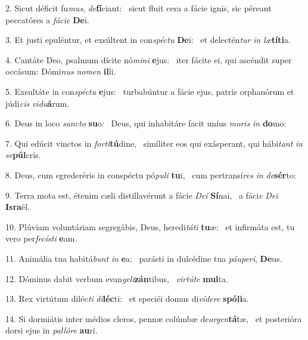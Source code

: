 2. Sicut déficit fu\textit{mus}, \textit{de}\textbf{fí}ciant: \ast\  sicut fluit cera a fácie ignis, sic péreant peccatóres a \textit{fá}\textit{ci}\textit{e} \textbf{De}i.\

3. Et justi epuléntur, et exsúltent in con\textit{spéc}\textit{tu} \textbf{De}i: \ast\  et delectén\textit{tur} \textit{in} \textit{læ}\textbf{tí}\textbf{ti}a.\

4. Cantáte Deo, psalmum dícite nó\textit{mi}\textit{ni} \textbf{e}jus: \ast\  iter fácite ei, qui ascéndit super occásum: Dómi\textit{nus} \textit{no}\textit{men} \textbf{il}li.\

5. Exsultáte in con\textit{spéc}\textit{tu} \textbf{e}jus: \ast\  turbabúntur a fácie ejus, patris orphanórum et júdi\textit{cis} \textit{vi}\textit{du}\textbf{á}rum.\

6. Deus in loco \textit{sanc}\textit{to} \textbf{su}o: \ast\  Deus, qui inhabitáre facit uníus \textit{mo}\textit{ris} \textit{in} \textbf{do}mo:\

7. Qui edúcit vinctos in \textit{for}\textit{ti}\textbf{tú}dine, \ast\  simíliter eos qui exásperant, qui hábi\textit{tant} \textit{in} \textit{se}\textbf{púl}cris.\

8. Deus, cum egrederéris in conspéctu pó\textit{pu}\textit{li} \textbf{tu}i, \ast\  cum pertransí\textit{res} \textit{in} \textit{de}\textbf{sér}to:\

9. Terra mota est, étenim cæli distillavérunt a fácie \textit{De}\textit{i} \textbf{Sí}nai, \ast\  a fáci\textit{e} \textit{De}\textit{i} \textbf{Is}\textbf{ra}ël.\

10. Plúviam voluntáriam segregábis, Deus, heredi\textit{tá}\textit{ti} \textbf{tu}æ: \ast\  et infirmáta est, tu vero per\textit{fe}\textit{cís}\textit{ti} \textbf{e}am.\

11. Animália tua habitá\textit{bunt} \textit{in} \textbf{e}a: \ast\  parásti in dulcédine tua \textit{páu}\textit{pe}\textit{ri}, \textbf{De}us.\

12. Dóminus dabit verbum evan\textit{ge}\textit{li}\textbf{zán}tibus, \ast\  \textit{vir}\textit{tú}\textit{te} \textbf{mul}ta.\

13. Rex virtútum diléc\textit{ti} \textit{di}\textbf{léc}ti: \ast\  et speciéi domus di\textit{ví}\textit{de}\textit{re} \textbf{spó}\textbf{li}a.\

14. Si dormiátis inter médios cleros, pennæ colúmbæ de\textit{ar}\textit{gen}\textbf{tá}tæ, \ast\  et posterióra dorsi ejus in \textit{pal}\textit{ló}\textit{re} \textbf{au}ri.\

